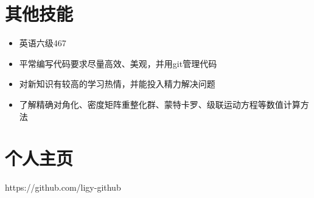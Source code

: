 \documentclass{resume}
\begin{document}
\section{其他技能}
\begin{itemize}%
\item 英语六级467
\item 平常编写代码要求尽量高效、美观，并用git管理代码
\item 对新知识有较高的学习热情，并能投入精力解决问题
\item 了解精确对角化、密度矩阵重整化群、蒙特卡罗、级联运动方程等数值计算方法
\end{itemize}

\section{个人主页}
\rm{https://github.com/ligy-github}


%  
\end{document}
